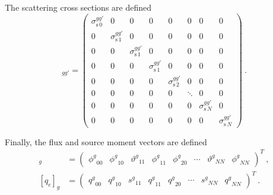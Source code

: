 \documentclass[12pt,twoside]{article}
\newcommand{\ve}[1]{\ensuremath{\mathbf{#1}}}
\newcommand{\sigg}[1]{\ensuremath{\sigma^{gg'}_{\text{s}\,#1}}}
\newcommand{\even}{\ensuremath{\phi^g}}
\newcommand{\odd}{\ensuremath{\vartheta^g}}
\newcommand{\qe}{\ensuremath{q^g}}
\newcommand{\qo}{\ensuremath{s^g}}
\begin{document}
%
The scattering cross sections are defined
\begin{equation}
  [\ve{S}]_{gg'} = \begin{pmatrix}
    \sigg{0} & 0 & 0 & 0 & 0 & 0 & 0 & 0 \\
    0 & \sigg{1} & 0 & 0 & 0 & 0 & 0 & 0 \\
    0 & 0 & \sigg{1} & 0 & 0 & 0 & 0 & 0 \\
    0 & 0 & 0 & \sigg{1} & 0 & 0 & 0 & 0 \\
    0 & 0 & 0 & 0 & \sigg{2} & 0 & 0 & 0 \\
    0 & 0 & 0 & 0 & 0 & \ddots   & 0 & 0 \\
    0 & 0 & 0 & 0 & 0 & 0 & \sigg{N} & 0 \\
    0 & 0 & 0 & 0 & 0 & 0 & 0 & \sigg{N}
  \end{pmatrix}\:.
\end{equation}

Finally, the flux and source moment vectors are defined
\begin{align}
  [\phi]_g &= \begin{pmatrix}
    \even_{00} & \even_{10} & \odd_{11} & \even_{11} & \even_{20}
    & \cdots & \odd_{NN} & \even_{NN}
  \end{pmatrix}^T\:,\\
  [q_e]_g &= \begin{pmatrix}
    \qe_{00} & \qe_{10} & \qo_{11} & \qe_{11} & \qe_{20}
    & \cdots & \qo_{NN} & \qe_{NN}
  \end{pmatrix}^T\:.
\end{align}


\end{document}
